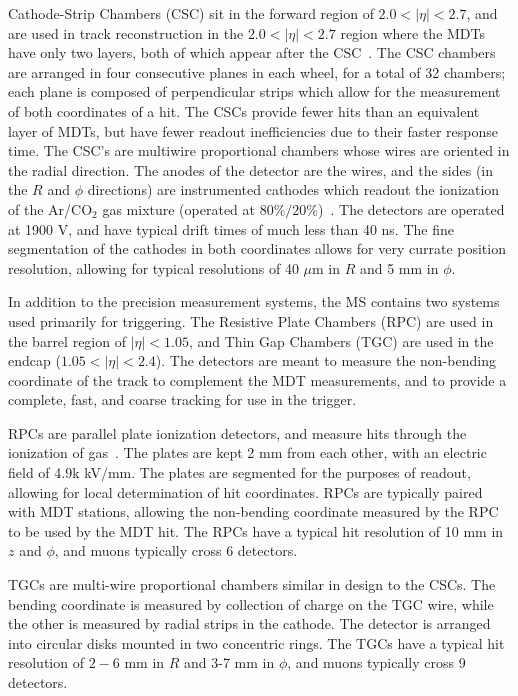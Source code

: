 Cathode-Strip Chambers (CSC) sit in the forward region of $2.0 < |\eta| < 2.7$, and are used in track reconstruction in the $2.0 < |\eta| < 2.7$ region where the MDTs have only two layers, both of which appear after the CSC~\cite{ATLASPaper}. The CSC chambers are arranged in four consecutive planes in each wheel, for a total of 32 chambers; each plane is composed of perpendicular strips which allow for the measurement of both coordinates of a hit. The CSCs provide fewer hits than an equivalent layer of MDTs, but have fewer readout inefficiencies due to their faster response time. The CSC's are multiwire proportional chambers whose wires are oriented in the radial direction. The anodes of the detector are the wires, and the sides (in the $R$ and $\phi$ directions) are instrumented cathodes which readout the ionization of the Ar/CO$_2$ gas mixture (operated at $80\%/20\%$)~\cite{Detectors,ATLASPaper}. The detectors are operated at 1900 V, and have typical drift times of much less than 40 ns. The fine segmentation of the cathodes in both coordinates allows for very currate position resolution, allowing for typical resolutions of 40 $\mu$m in $R$ and 5 mm in $\phi$.

In addition to the precision measurement systems, the MS contains two systems used primarily for triggering. The Resistive Plate Chambers (RPC) are used in the barrel region of $|\eta| < 1.05$, and Thin Gap Chambers (TGC) are used in the endcap ($1.05 < |\eta| < 2.4$). The detectors are meant to measure the non-bending coordinate of the track to complement the MDT measurements, and to provide a complete, fast, and coarse tracking for use in the trigger. 

RPCs are parallel plate ionization detectors, and measure hits through the ionization of gas~\cite{Detectors,ATLASPaper}. The plates are kept 2 mm from each other, with an electric field of 4.9k kV/mm. The plates are segmented for the purposes of readout, allowing for local determination of hit coordinates. RPCs are typically paired with MDT stations, allowing the non-bending coordinate measured by the RPC to be used by the MDT hit. The RPCs have a typical hit resolution of 10 mm in $z$ and $\phi$, and muons typically cross 6 detectors. 

TGCs are multi-wire proportional chambers similar in design to the CSCs.  The bending coordinate is measured by collection of charge on the TGC wire, while the other is measured by radial strips in the cathode. The detector is arranged into circular disks mounted in two concentric rings. The TGCs have a typical hit resolution of $2-6$ mm in $R$ and 3-7 mm in $\phi$, and muons typically cross 9 detectors.

